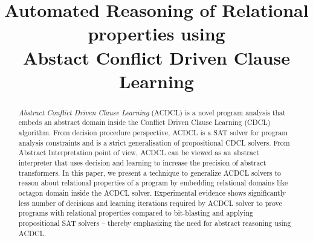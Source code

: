 \documentclass[a4paper,conference]{llncs}
\newcommand{\Omit}[1]{}
\begin{document}
\title{Automated Reasoning of Relational properties using \\
Abstact Conflict Driven Clause Learning}

\Omit{
\author{Rajdeep Mukherjee\inst{1} \and
Peter Schrammel\inst{2} \and
Daniel Kroening\inst{1}}

\institute{University of Oxford, UK \and University of Sussex, UK \\
\email{\{rajdeep.mukherjee,kroening\}@cs.ox.ac.uk},
\email{P.Schrammel@sussex.ac.uk}}
}
\maketitle

\begin{abstract}
%
{\em Abstract Conflict Driven Clause Learning} (ACDCL) is a novel program 
analysis that embeds an abstract domain inside the Conflict Driven Clause 
Learning (CDCL) algorithm. From decision procedure perspective, ACDCL is a 
SAT solver for program analysis constraints and is a strict generalisation 
of propositional CDCL solvers. From Abstract Interpretation point of view, 
ACDCL can be viewed as an abstract interpreter that uses decision and 
learning to increase the precision of abstract transformers. In this paper, 
we present a technique to generalize ACDCL solvers to reason about relational 
properties of a program by embedding relational domains like octagon domain 
inside the ACDCL solver.  Experimental evidence shows significantly less 
number of decisions and learning iterations required by ACDCL solver to 
prove programs with relational properties compared to bit-blasting and 
applying propositional SAT solvers -- thereby emphasizing the need for 
abstract reasoning using ACDCL. 
%
\end{abstract}






\end{document}
